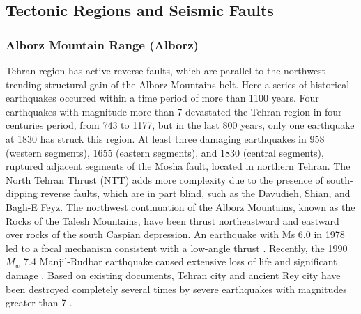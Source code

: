 \subsection{Tectonic Regions and Seismic Faults}

\subsubsection{Alborz Mountain Range (Alborz)}
Tehran region has active reverse faults, which are parallel to the northwest-trending structural gain of the Alborz Mountains belt. Here a series of historical earthquakes occurred within a time period of more than 1100 years. Four earthquakes with magnitude more than 7 devastated the Tehran region in four centuries period, from 743 to 1177, but in the last 800 years, only one earthquake at 1830 has struck this region. At least three damaging earthquakes in 958 (western segments), 1655 (eastern segments), and 1830 (central segments), ruptured adjacent segments of the Mosha fault, located in northern Tehran.
The North Tehran Thrust (NTT) adds more complexity due to the presence of south-dipping reverse faults, which are in part blind, such as the Davudieh, Shian, and Bagh-E Feyz.
The northwest continuation of the Alborz Mountains, known as the Rocks of the Talesh Mountains, have been thrust northeastward and eastward over rocks of the south Caspian depression. An earthquake with Ms 6.0 in 1978 led to a focal mechanism consistent with a low-angle thrust \citep{Berberian1999}. Recently, the 1990 $M_w$ 7.4 Manjil-Rudbar earthquake caused extensive loss of life and significant damage \citep{USGS_manjil}. Based on existing documents, Tehran city and ancient Rey city have been destroyed completely several times by severe earthquakes with magnitudes greater than 7 \citep{Ambraseys2005}. \\

